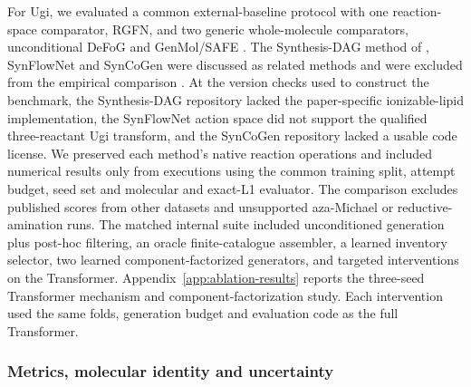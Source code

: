 \documentclass{article}
\theoremstyle{definition}
\begin{document}
For Ugi, we evaluated a common external-baseline protocol with one
reaction-space comparator, RGFN, and two generic whole-molecule comparators, unconditional DeFoG
and GenMol/SAFE \citep{koziarski2024rgfn,qin2025defog,lee2025genmol}.
The Synthesis-DAG method of \citet{ou2024deep}, SynFlowNet and SynCoGen were discussed as related methods and were
excluded from the empirical comparison \citep{cretu2025synflownet,rekesh2025syncogen}.
At the version checks used to construct the benchmark, the Synthesis-DAG repository lacked the
paper-specific ionizable-lipid implementation, the SynFlowNet action space did not support the
qualified three-reactant Ugi transform, and the SynCoGen repository lacked a usable code license.
We preserved each method's native reaction operations and included numerical results only from
executions using the common training split, attempt budget, seed set and molecular and exact-L1
evaluator. The comparison excludes published scores from other datasets and unsupported
aza-Michael or reductive-amination runs.
The matched internal suite included unconditioned generation plus post-hoc filtering, an
oracle finite-catalogue assembler, a learned inventory selector, two learned component-factorized
generators, and targeted interventions on the Transformer. Appendix~\ref{app:ablation-results}
reports the three-seed Transformer mechanism and component-factorization study. Each
intervention used the same folds, generation budget and evaluation code as the full Transformer.

\subsubsection{Metrics, molecular identity and uncertainty}
\end{document}
